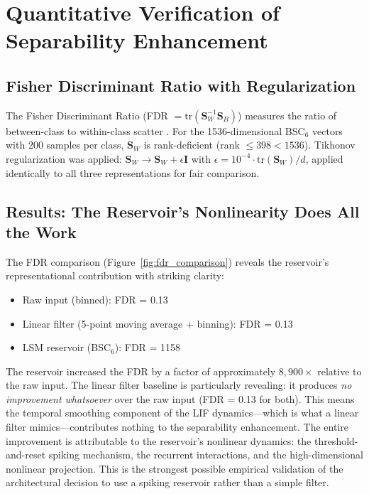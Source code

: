 \section{Quantitative Verification of Separability Enhancement}
\label{sec:separability}

\subsection{Fisher Discriminant Ratio with Regularization}

The Fisher Discriminant Ratio (FDR $= \text{tr}(\mathbf{S}_W^{-1} \mathbf{S}_B)$) measures the ratio of between-class to within-class scatter \cite{duda_pattern_2001}. For the 1536-dimensional BSC$_6$ vectors with 200 samples per class, $\mathbf{S}_W$ is rank-deficient (rank $\leq 398 < 1536$). Tikhonov regularization was applied: $\mathbf{S}_W \to \mathbf{S}_W + \epsilon \mathbf{I}$ with $\epsilon = 10^{-4} \cdot \text{tr}(\mathbf{S}_W)/d$, applied identically to all three representations for fair comparison.

\subsection{Results: The Reservoir's Nonlinearity Does All the Work}

The FDR comparison (Figure~\ref{fig:fdr_comparison}) reveals the reservoir's representational contribution with striking clarity:
\begin{itemize}
    \item Raw input (binned): FDR = 0.13
    \item Linear filter (5-point moving average + binning): FDR = 0.13
    \item LSM reservoir (BSC$_6$): FDR = 1158
\end{itemize}

The reservoir increased the FDR by a factor of approximately $8{,}900\times$ relative to the raw input. The linear filter baseline is particularly revealing: it produces \emph{no improvement whatsoever} over the raw input (FDR = 0.13 for both). This means the temporal smoothing component of the LIF dynamics---which is what a linear filter mimics---contributes nothing to the separability enhancement. The entire improvement is attributable to the reservoir's nonlinear dynamics: the threshold-and-reset spiking mechanism, the recurrent interactions, and the high-dimensional nonlinear projection. This is the strongest possible empirical validation of the architectural decision to use a spiking reservoir rather than a simple filter.

